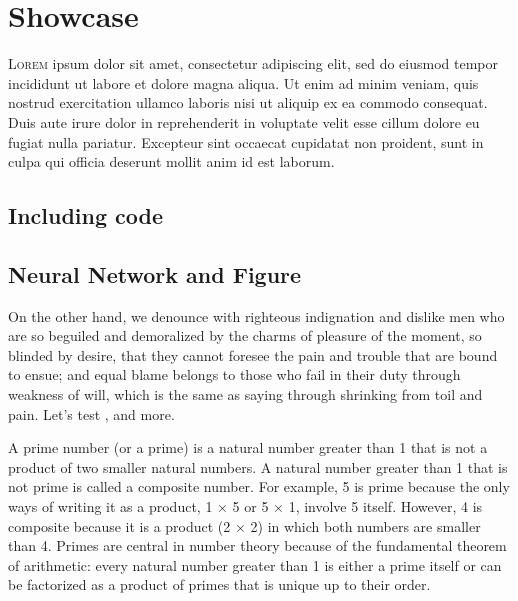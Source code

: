 

\chapter{Showcase}



\lettrine{L}{orem} ipsum dolor sit amet, consectetur adipiscing elit, sed do
eiusmod tempor incididunt ut labore et dolore magna aliqua. Ut enim ad minim
veniam, quis nostrud exercitation ullamco laboris nisi ut aliquip ex ea commodo
consequat. Duis aute irure dolor in reprehenderit in voluptate velit esse cillum
dolore eu fugiat nulla pariatur. Excepteur sint occaecat cupidatat non proident,
sunt in culpa qui officia deserunt mollit anim id est laborum.


\section{Including code}



\section{Neural Network and Figure}

On the other hand, we denounce with righteous indignation and dislike men who
are so beguiled and demoralized by the charms of pleasure of the moment, so
blinded by desire, that they cannot foresee the pain and trouble that are bound
to ensue; and equal blame belongs to those who fail in their duty through
weakness of will, which is the same as saying through shrinking from toil and
pain. Let's test , and more.

A prime number (or a prime) is a natural number greater than 1 that is not a
product of two smaller natural numbers. A natural number greater than 1 that is
not prime is called a composite number. For example, 5 is prime because the only
ways of writing it as a product, 1 × 5 or 5 × 1, involve 5 itself. However, 4 is
composite because it is a product (2 × 2) in which both numbers are smaller than
4. Primes are central in number theory because of the fundamental theorem of
arithmetic: every natural number greater than 1 is either a prime itself or can
be factorized as a product of primes that is unique up to their order.

